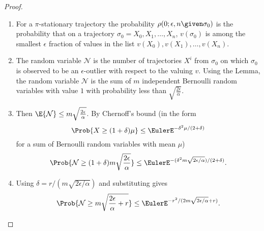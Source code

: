 \documentclass[12pt]{article}
\begin{document}
\begin{proof}
    \begin{enumerate}
        \item
            For a \( \pi \)-stationary trajectory the probability \(
            \rho(0; \epsilon, n \given \sigma_0) \) is the probability
            that on a trajectory \( \sigma_0 = X_0, X_1, \dots, X_n \), \(
            v(\sigma_0) \) is among the smallest \( \epsilon \) fraction
            of values in the list \( v(X_0), v(X_1), \dots, v(X_n) \).
        \item
            The random variable \( \mathcal{N} \) is the number of
            trajectories \( X^i \) from \( \sigma_0 \) on which \(
            \sigma_0 \) is observed to be an \( \epsilon \)-outlier with
            respect to the valuing \( v \).  Using the Lemma, the random
            variable \( \mathcal{N} \) is the sum of \( m \) independent
            Bernoulli random variables with value \( 1 \) with
            probability less than \( \sqrt{\frac{2 \epsilon}{\alpha}} \).
        \item
            Then \( \E{\mathcal{N}} \le m \sqrt{\frac{2 \epsilon}{\alpha}}
            \).  By Chernoff's bound (in the form
            \[
                \Prob{X \ge (1 + \delta) \mu } \le \EulerE^{-\delta^2\mu/
                (2 + \delta)}
            \] for a sum of Bernoulli random variables with mean \( \mu \))
            \[
                \Prob{\mathcal{N} \ge (1 + \delta) m \sqrt{\frac{2\epsilon}
                {\alpha}} } \le \EulerE^{ -(\delta^{2} m\sqrt{2\epsilon/\alpha})/
                (2 + \delta)}.
            \]
        \item
            Using \( \delta = r/(m \sqrt{2\epsilon/\alpha}) \) and
            substituting gives
            \[
                \Prob{\mathcal{N} \ge m \sqrt{\frac{2\epsilon}{\alpha} +
                r} } \le \EulerE^{ -r^{2}/ (2 m\sqrt{2\epsilon/\alpha} +
                r)}.
            \]
    \end{enumerate}
\end{proof}

\end{document}
